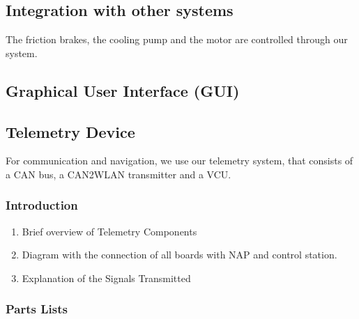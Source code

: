 \subsection{Integration with other systems}
The friction brakes, the cooling pump and the motor are controlled through our system.

\subsection{Graphical User Interface (GUI)}


\subsection{Telemetry Device}
For communication and navigation, we use our telemetry system, that consists of a CAN bus, a CAN2WLAN transmitter and a VCU.
\subsubsection{Introduction}
\begin{enumerate}
    \item Brief overview of Telemetry Components
    \item Diagram with the connection of all boards with NAP and control station.
    \item Explanation of the Signals Transmitted
\end{enumerate}

\subsubsection{Parts Lists}